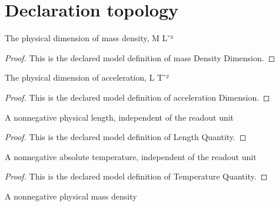 \section{Declaration topology}
\begin{definition}
  \label{def:physics:phyx-mini-0391:phyxminiproblems-problemphyxmini0391-massdensitydimension}
  The physical dimension of mass density, M L⁻³
\end{definition}
\begin{proof}
  This is the declared model definition of mass Density Dimension.
\end{proof}
\begin{definition}
  \label{def:physics:phyx-mini-0391:phyxminiproblems-problemphyxmini0391-accelerationdimension}
  The physical dimension of acceleration, L T⁻²
\end{definition}
\begin{proof}
  This is the declared model definition of acceleration Dimension.
\end{proof}
\begin{definition}
  \label{def:physics:phyx-mini-0391:phyxminiproblems-problemphyxmini0391-lengthquantity}
  A nonnegative physical length, independent of the readout unit
\end{definition}
\begin{proof}
  This is the declared model definition of Length Quantity.
\end{proof}
\begin{definition}
  \label{def:physics:phyx-mini-0391:phyxminiproblems-problemphyxmini0391-temperaturequantity}
  A nonnegative absolute temperature, independent of the readout unit
\end{definition}
\begin{proof}
  This is the declared model definition of Temperature Quantity.
\end{proof}
\begin{definition}
  \label{def:physics:phyx-mini-0391:phyxminiproblems-problemphyxmini0391-massdensityquantity}
  A nonnegative physical mass density
\end{definition}
